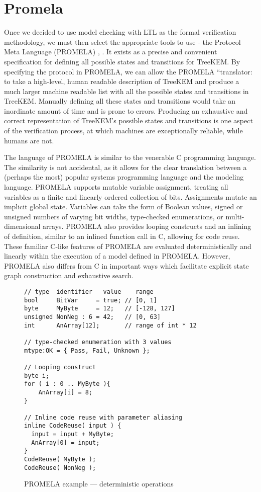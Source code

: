 \hypertarget{promela}{%
\section{Promela}\label{promela}}

Once we decided to use model checking with LTL as the formal verification methodology, we must then select the appropriate tools to use - the Protocol Meta Language (PROMELA) \autocite{holzmann1980basic}, \autocite{holzmann1990design}.
It exists as a precise and convenient specification for defining all possible states and transitions for TreeKEM.
By specifying the protocol in PROMELA, we can allow the PROMELA ``translator: to take a high-level, human readable description of TreeKEM and produce a much larger machine readable list with all the possible states and transitions in TreeKEM.
Manually defining all these states and transitions would take an inordinate amount of time and is prone to errors.
Producing an exhaustive and correct representation of TreeKEM's possible states and transitions is one aspect of the verification process, at which machines are exceptionally reliable, while humans are not.

The language of PROMELA is similar to the venerable C programming language.
The similarity is not accidental, as it allows for the clear translation between a (perhaps the most) popular systems programming language and the modeling language.
PROMELA supports mutable variable assignment, treating all variables as a finite and linearly ordered collection of bits.
Assignments mutate an implicit global state.
Variables can take the form of Boolean values, signed or unsigned numbers of varying bit widths, type-checked enumerations, or multi-dimensional arrays.
PROMELA also provides looping constructs and an inlining of definition, similar to an inlined function call in C, allowing for code reuse.
These familiar C-like features of PROMELA are evaluated deterministically and linearly within the execution of a model defined in PROMELA.
However, PROMELA also differs from C in important ways which facilitate explicit state graph construction and exhaustive search.

\begin{figure}
\centering
\caption{PROMELA example --- deterministic operations}
\begin{verbatim}
// type  identifier   value    range
bool     BitVar     = true; // [0, 1]
byte     MyByte     = 12;   // [-128, 127]
unsigned NonNeg : 6 = 42;   // [0, 63]
int      AnArray[12];       // range of int * 12

// type-checked enumeration with 3 values
mtype:OK = { Pass, Fail, Unknown };

// Looping construct
byte i;
for ( i : 0 .. MyByte ){
    AnArray[i] = 8;
}

// Inline code reuse with parameter aliasing
inline CodeReuse( input ) {
  input = input + MyByte;
  AnArray[0] = input;
}
CodeReuse( MyByte );
CodeReuse( NonNeg );
\end{verbatim}
\end{figure}


